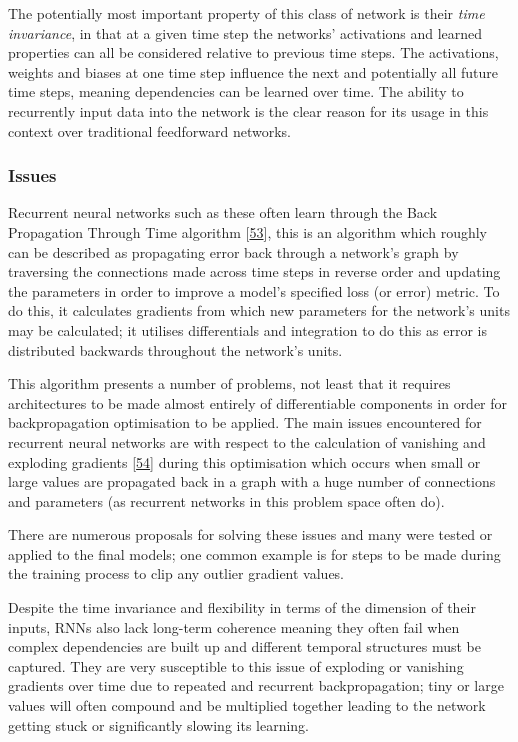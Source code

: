 \documentclass[12pt,]{article}
\begin{document}
The potentially most important property of this class of network is
their \emph{time invariance}, in that at a given time step the networks'
activations and learned properties can all be considered relative to
previous time steps. The activations, weights and biases at one time
step influence the next and potentially all future time steps, meaning
dependencies can be learned over time. The ability to recurrently input
data into the network is the clear reason for its usage in this context
over traditional feedforward networks.

\hypertarget{issues}{%
\subsubsection{Issues}\label{issues}}

Recurrent neural networks such as these often learn through the Back
Propagation Through Time algorithm
{[}\protect\hyperlink{ref-werbos1990backpropagation}{53}{]}, this is an
algorithm which roughly can be described as propagating error back
through a network's graph by traversing the connections made across time
steps in reverse order and updating the parameters in order to improve a
model's specified loss (or error) metric. To do this, it calculates
gradients from which new parameters for the network's units may be
calculated; it utilises differentials and integration to do this as
error is distributed backwards throughout the network's units.

This algorithm presents a number of problems, not least that it requires
architectures to be made almost entirely of differentiable components in
order for backpropagation optimisation to be applied. The main issues
encountered for recurrent neural networks are with respect to the
calculation of vanishing and exploding gradients
{[}\protect\hyperlink{ref-pascanu2012understanding}{54}{]} during this
optimisation which occurs when small or large values are propagated back
in a graph with a huge number of connections and parameters (as
recurrent networks in this problem space often do).

There are numerous proposals for solving these issues and many were
tested or applied to the final models; one common example is for steps
to be made during the training process to clip any outlier gradient
values.

Despite the time invariance and flexibility in terms of the dimension of
their inputs, RNNs also lack long-term coherence meaning they often fail
when complex dependencies are built up and different temporal structures
must be captured. They are very susceptible to this issue of exploding
or vanishing gradients over time due to repeated and recurrent
backpropagation; tiny or large values will often compound and be
multiplied together leading to the network getting stuck or
significantly slowing its learning.
\end{document}
